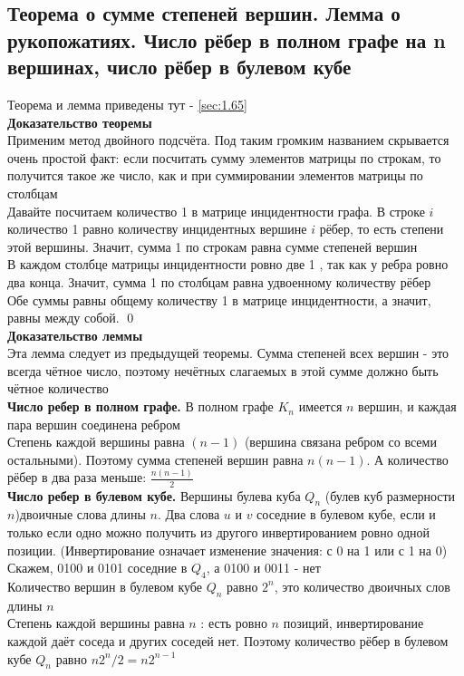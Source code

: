 \documentclass[a4paper]{article}
\begin{document}
\subsection{Теорема о сумме степеней вершин. Лемма о рукопожатиях. Число рёбер в полном графе на n вершинах, число рёбер в булевом кубе}
Теорема и лемма приведены тут - \ref{sec:1.65}\\[2mm]
\textbf{Доказательство теоремы}\\[2mm]
Применим метод двойного подсчёта. Под таким громким названием скрывается очень простой факт: если посчитать сумму элементов матрицы по строкам, то получится такое же число, как и при суммировании элементов матрицы по столбцам\\[2mm]
Давайте посчитаем количество 1 в матрице инцидентности графа. В строке $i$ количество 1 равно количеству инцидентных вершине $i$ рёбер, то есть степени этой вершины. Значит, сумма 1 по строкам равна сумме степеней вершин\\[2mm]
В каждом столбце матрицы инцидентности ровно две 1 , так как у ребра ровно два конца. Значит, сумма 1 по столбцам равна удвоенному количеству рёбер\\[2mm]
Обе суммы равны общему количеству 1 в матрице инцидентности, а значит, равны между собой. \qed\\[7mm]
\textbf{Доказательство леммы}\\[2mm]
 Эта лемма следует из предыдущей теоремы. Сумма степеней всех вершин - это всегда чётное число, поэтому нечётных слагаемых в этой сумме должно быть чётное количество\\[2mm]
\textbf{Число ребер в полном графе.} В полном графе $K_{n}$ имеется $n$ вершин, и каждая пара вершин соединена ребром\\[2mm]
 Степень каждой вершины равна $(n-1)$ (вершина связана ребром со всеми остальными). Поэтому сумма степеней вершин равна $n(n-1)$. А количество рёбер в два раза меньше: $\frac{n(n-1)}{2}$\\[2mm]
\textbf{Число ребер в булевом кубе.} Вершины булева куба $Q_{n}$ (булев куб размерности $n$)двоичные слова длины $n$. Два слова $u$ и $v$ соседние в булевом кубе, если и только если одно можно получить из другого инвертированием ровно одной позиции. (Инвертирование означает изменение значения: с 0 на 1 или с 1 на 0)\\[2mm]
 Скажем, 0100 и 0101 соседние в $Q_{4}$, а 0100 и 0011 - нет\\[2mm]
Количество вершин в булевом кубе $Q_{n}$ равно $2^{n}$, это количество двоичных слов длины $n$\\[2mm]
 Степень каждой вершины равна $n$ : есть ровно $n$ позиций, инвертирование каждой даёт соседа и других соседей нет. Поэтому количество рёбер в булевом кубе $Q_{n}$ равно $n 2^{n} / 2=n 2^{n-1}$
\end{document}
